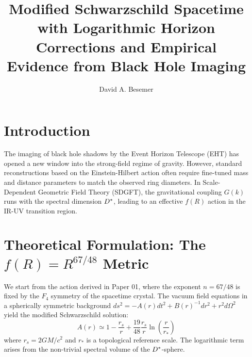 \documentclass[a4paper,11pt]{article}
\begin{document}
\title{Modified Schwarzschild Spacetime with Logarithmic Horizon Corrections and Empirical Evidence from Black Hole Imaging}

\author{David A. Besemer}



\maketitle

\section{Introduction}
The imaging of black hole shadows by the Event Horizon Telescope (EHT) has opened a new window into the strong-field regime of gravity. However, standard reconstructions based on the Einstein-Hilbert action often require fine-tuned mass and distance parameters to match the observed ring diameters. In Scale-Dependent Geometric Field Theory (SDGFT), the gravitational coupling $G(k)$ runs with the spectral dimension $D^{*}$, leading to an effective $f(R)$ action in the IR-UV transition region.

\section{Theoretical Formulation: The $f(R) = R^{67/48}$ Metric}
We start from the action derived in Paper 01, where the exponent $n = 67/48$ is fixed by the $F_4$ symmetry of the spacetime crystal. The vacuum field equations in a spherically symmetric background $ds^2 = -A(r)dt^2 + B(r)^{-1}dr^2 + r^2 d\Omega^2$ yield the modified Schwarzschild solution:
\begin{equation}
  A(r) \simeq 1 - \frac{r_s}{r} + \frac{19}{48} \frac{r_s}{r} \ln\left(\frac{r}{r_*}\right)
\end{equation}
where $r_s = 2GM/c^2$ and $r_*$ is a topological reference scale. The logarithmic term arises from the non-trivial spectral volume of the $D^{*}$-sphere.
\end{document}
